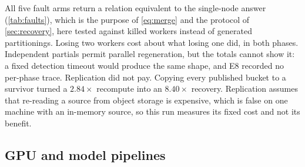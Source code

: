 \documentclass[10pt,twocolumn,letterpaper]{article}   %
\newcommand{\E}[1]{\textsf{E#1}}
\begin{document}
All five fault arms return a relation equivalent to the single-node answer (\cref{tab:faults}),
which is the purpose of \cref{eq:merge} and the protocol of \cref{sec:recovery}, here tested
against killed workers instead of generated partitionings. Losing two workers cost about what
losing one did, in both phases. Independent partials permit parallel regeneration, but the
totals cannot show it: a fixed detection timeout would produce the same shape, and \E{8}
recorded no per-phase trace. Replication did not pay. Copying every published bucket to a
survivor turned a $2.84\times$ recompute into an $8.40\times$ recovery. Replication assumes that
re-reading a source from object storage is expensive, which is false on one machine with an
in-memory source, so this run measures its fixed cost and not its benefit.

\subsection{GPU and model pipelines}
\label{sec:eval-gpu}
\end{document}
